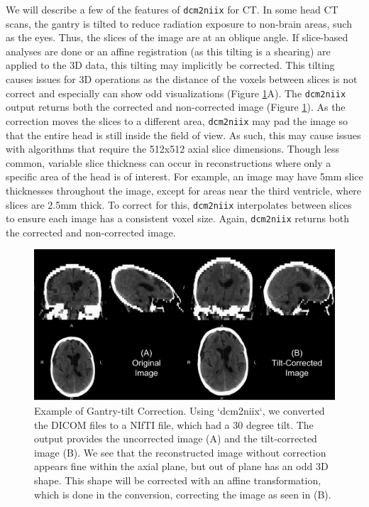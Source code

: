 \documentclass[]{elsarticle} %
\begin{document}
We will describe a few of the features of \texttt{dcm2niix} for CT. In some head CT scans, the gantry is tilted to reduce radiation exposure to non-brain areas, such as the eyes. Thus, the slices of the image are at an oblique angle. If slice-based analyses are done or an affine registration (as this tilting is a shearing) are applied to the 3D data, this tilting may implicitly be corrected. This tilting causes issues for 3D operations as the distance of the voxels between slices is not correct and especially can show odd visualizations (Figure \ref{fig:gantry}A). The \texttt{dcm2niix} output returns both the corrected and non-corrected image (Figure \ref{fig:gantry}). As the correction moves the slices to a different area, \texttt{dcm2niix} may pad the image so that the entire head is still inside the field of view. As such, this may cause issues with algorithms that require the 512x512 axial slice dimensions. Though less common, variable slice thickness can occur in reconstructions where only a specific area of the head is of interest. For example, an image may have 5mm slice thicknesses throughout the image, except for areas near the third ventricle, where slices are 2.5mm thick. To correct for this, \texttt{dcm2niix} interpolates between slices to ensure each image has a consistent voxel size. Again, \texttt{dcm2niix} returns both the corrected and non-corrected image.

\begin{figure}
\includegraphics[width=1\linewidth]{index_files/figure-latex/gantry-1} \caption{Example of Gantry-tilt Correction.  Using `dcm2niix`, we converted the DICOM files to a NIfTI file, which had a 30 degree tilt.  The output provides the uncorrected image (A) and the tilt-corrected image (B).  We see that the reconstructed image without correction appears fine within the axial plane, but out of plane has an odd 3D shape.  This shape will be corrected with an affine transformation, which is done in the conversion, correcting the image as seen in (B). }\label{fig:gantry}
\end{figure}
\end{document}
